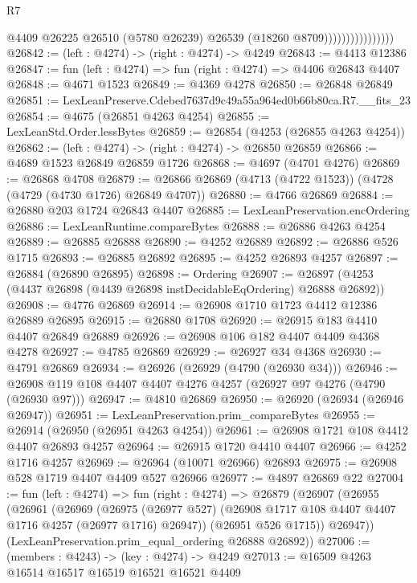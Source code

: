 \begin{lexlean}{R7}
\begin{coremodule}
                                  @4409
                                  @26225
                                  @26510
                                  (@5780 @26239)
                                  @26539
                                  (@18260 @8709))))))))))))))))
@26842 := (left : @4274) -> (right : @4274) -> @4249
@26843 := @4413 @12386
@26847 := fun (left : @4274) => fun (right : @4274) => @4406 @26843 @4407
@26848 := @4671 @1523
@26849 := @4369 @4278
@26850 := @26848 @26849
@26851 := LexLeanPreserve.Cdebed7637d9c49a55a964ed0b66b80ca.R7.__fits_23
@26854 := @4675 (@26851 @4263 @4254)
@26855 := LexLeanStd.Order.lessBytes
@26859 := @26854 (@4253 (@26855 @4263 @4254))
@26862 := (left : @4274) -> (right : @4274) -> @26850 @26859
@26866 := @4689 @1523 @26849 @26859 @1726
@26868 := @4697 (@4701 @4276)
@26869 := @26868 @4708
@26879 := @26866 @26869 (@4713 (@4722 @1523)) (@4728 (@4729 (@4730 @1726) @26849 @4707))
@26880 := @4766 @26869
@26884 := @26880 @203 @1724 @26843 @4407
@26885 := LexLeanPreservation.encOrdering
@26886 := LexLeanRuntime.compareBytes
@26888 := @26886 @4263 @4254
@26889 := @26885 @26888
@26890 := @4252 @26889
@26892 := @26886 @526 @1715
@26893 := @26885 @26892
@26895 := @4252 @26893 @4257
@26897 := @26884 (@26890 @26895)
@26898 := Ordering
@26907 := @26897 (@4253 (@4437 @26898 (@4439 @26898 instDecidableEqOrdering) @26888 @26892))
@26908 := @4776 @26869
@26914 := @26908 @1710 @1723 @4412 @12386 @26889 @26895
@26915 := @26880 @1708
@26920 := @26915 @183 @4410 @4407 @26849 @26889
@26926 := @26908 @106 @182 @4407 @4409 @4368 @4278
@26927 := @4785 @26869
@26929 := @26927 @34 @4368
@26930 := @4791 @26869
@26934 := @26926 (@26929 (@4790 (@26930 @34)))
@26946 := @26908 @119 @108 @4407 @4407 @4276 @4257 (@26927 @97 @4276 (@4790 (@26930 @97)))
@26947 := @4810 @26869
@26950 := @26920 (@26934 (@26946 @26947))
@26951 := LexLeanPreservation.prim_compareBytes
@26955 := @26914 (@26950 (@26951 @4263 @4254))
@26961 := @26908 @1721 @108 @4412 @4407 @26893 @4257
@26964 := @26915 @1720 @4410 @4407
@26966 := @4252 @1716 @4257
@26969 := @26964 (@10071 @26966) @26893
@26975 := @26908 @528 @1719 @4407 @4409 @527 @26966
@26977 := @4897 @26869 @22
@27004 := fun (left : @4274) =>
  fun (right : @4274) =>
  @26879
    (@26907
      (@26955
        (@26961
          (@26969
            (@26975 (@26977 @527) (@26908 @1717 @108 @4407 @4407 @1716 @4257 (@26977 @1716) @26947))
            (@26951 @526 @1715))
          @26947))
      (LexLeanPreservation.prim_equal_ordering @26888 @26892))
@27006 := (members : @4243) -> (key : @4274) -> @4249
@27013 := @16509 @4263 @16514 @16517 @16519 @16521 @16521 @4409

\end{coremodule}
\end{lexlean}
